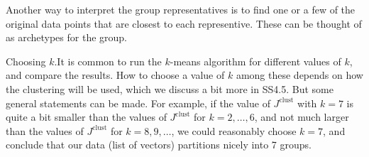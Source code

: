 Another way to interpret the group representatives is to find one or a few of the original data points that are closest to each representive. These can be thought of as archetypes for the group.

Choosing \(k\).It is common to run the \(k\)-means algorithm for different values of \(k\), and compare the results. How to choose a value of \(k\) among these depends on how the clustering will be used, which we discuss a bit more in SS4.5. But some general statements can be made. For example, if the value of \(J^{\mathrm{clust}}\) with \(k=7\) is quite a bit smaller than the values of \(J^{\mathrm{clust}}\) for \(k=2,\ldots,6\), and not much larger than the values of \(J^{\mathrm{clust}}\) for \(k=8,9,\ldots\), we could reasonably choose \(k=7\), and conclude that our data (list of vectors) partitions nicely into 7 groups.

 